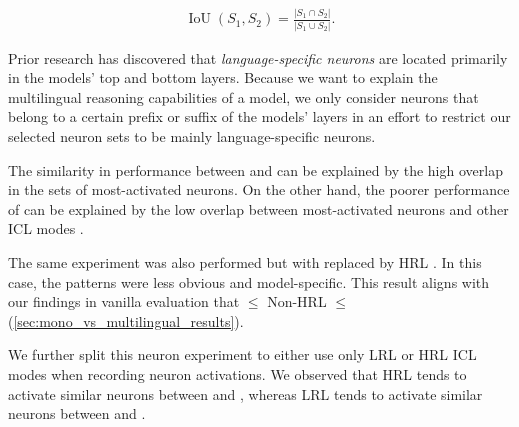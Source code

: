 \begin{equation}
    \begin{aligned}
    \operatorname{IoU}\left(S_1, S_2\right)=\frac{\left|S_1 \cap S_2\right|}{\left|S_1 \cup S_2\right|}.
    \end{aligned}
    \label{eq:iou}
\end{equation}

Prior research \cite{language_specific_neuron_msra,neuron_plnd} has discovered that \textit{language-specific neurons} are located primarily in the models' top and bottom layers. Because we want to explain the multilingual reasoning capabilities of a model, we only consider neurons that belong to a certain prefix or suffix of the models' layers in an effort to restrict our selected neuron sets to be mainly language-specific neurons. 

The similarity in performance between \multilingual and \native can be explained by the high overlap in the sets of most-activated neurons. On the other hand, the poorer performance of \english can be explained by the low overlap between \english most-activated neurons and other ICL modes . 

The same experiment was also performed but with  \multilingual replaced by HRL \chinese. In this case, the patterns were less obvious and model-specific. This result aligns with our findings in vanilla evaluation that \english $\le$ Non-\english HRL \monolingual $\le$ \multilingual (\cref{sec:mono_vs_multilingual_results}).

We further split this neuron experiment to either use only LRL or HRL ICL modes when recording neuron activations. We observed that HRL tends to activate similar neurons between \native and \multilingual, whereas LRL tends to activate similar neurons between \english and \multilingual.















